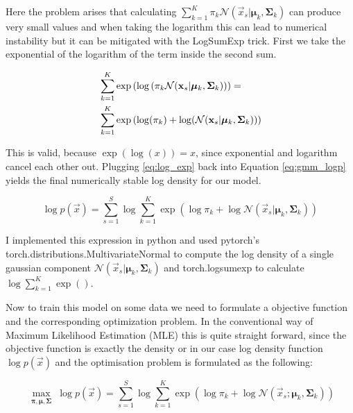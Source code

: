 Here the problem arises that calculating $\sum_{k=1}^K \pi_k \mathcal{N}(\vec x_s|\boldsymbol{\mu}_k, \boldsymbol{\Sigma}_k)$ can 
produce very small values and when taking the logarithm this can lead to numerical instability but it can be mitigated with the LogSumExp trick.
First we take the exponential of the logarithm of the term inside the second sum. 

\begin{align}
    & \sum_{k=1}^K \exp\left( \log \left( \pi_k \mathcal{N}(\vec x_s|\boldsymbol{\mu}_k, \boldsymbol{\Sigma}_k) \right)\right) = \notag \\ 
    & \sum_{k=1}^K \exp\left( \log (\pi_k) + \log (\mathcal{N}(\vec x_s|\boldsymbol{\mu}_k, \boldsymbol{\Sigma}_k))\right)
    \label{eq:log_exp}
\end{align}

This is valid, because $\exp (\log(x)) = x$, since exponential and logarithm cancel each other out.
Plugging \ref{eq:log_exp} back into Equation \ref{eq:gmm_logp} yields the final numerically stable log density for our model. 

\begin{equation}
    \log p(\vec x) = \sum_{s=1}^S \log \sum_{k=1}^K \exp\left( \log \pi_k + \log \mathcal{N}(\vec x_s|\boldsymbol{\mu}_k, \boldsymbol{\Sigma}_k)\right)
    \label{eq:gmm_logp_final}
\end{equation}

I implemented this expression in python and used pytorch's torch.distributions.MultivariateNormal to compute the log density of a single 
gaussian component $\mathcal{N}(\vec x_s|\boldsymbol{\mu}_k, \boldsymbol{\Sigma}_k)$ and torch.logsumexp to calculate $\log \sum_{k=1}^K \exp()$.

Now to train this model on some data we need to formulate a objective function and the corresponding optimization problem. In the conventional way of Maximum Likelihood Estimation
(MLE) this is quite straight forward, since the objective function is exactly the density or in our case log density function 
$\log p(\vec x)$ and the optimisation problem is formulated as the following: 

\begin{equation}
    \max_{\substack{\boldsymbol \pi, \boldsymbol \mu, \boldsymbol \Sigma}} \log p(\vec x) = \sum_{s=1}^S \log \sum_{k=1}^K \exp\left( \log \pi_k + \log \mathcal{N}(\vec x_s;\boldsymbol{\mu}_k, \boldsymbol{\Sigma}_k)\right)
    \label{eq:gmm_objective}
\end{equation}

